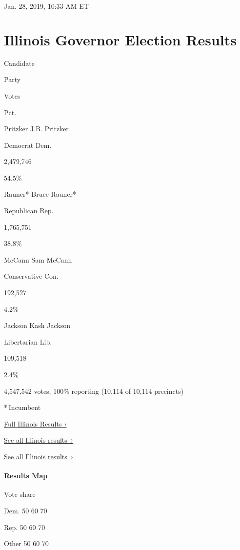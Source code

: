 Jan. 28, 2019, 10:33 AM ET

\hypertarget{illinois-governor-election-results}{%
\section{Illinois Governor Election
Results}\label{illinois-governor-election-results}}

Candidate

Party

Votes

Pct.

 Pritzker J.B. Pritzker

Democrat Dem.

2,479,746

54.5\%

 Rauner* Bruce Rauner*

Republican Rep.

1,765,751

38.8\%

 McCann Sam McCann

Conservative Con.

192,527

4.2\%

 Jackson Kash Jackson

Libertarian Lib.

109,518

2.4\%

4,547,542 votes, 100\% reporting (10,114 of 10,114 precincts)

* Incumbent

\href{https://www.nytimes.com/interactive/2018/11/06/us/elections/results-illinois-elections.html}{Full
Illinois Results ›}

\href{https://www.nytimes.com/interactive/2018/11/06/us/elections/results-illinois-elections.html}{See
all Illinois results~›}

\href{https://www.nytimes.com/interactive/2018/11/06/us/elections/results-illinois-elections.html}{See
all Illinois results~›}

\hypertarget{results-map}{%
\paragraph{Results Map}\label{results-map}}

Vote share

Dem. 50 60 70

Rep. 50 60 70

Other 50 60 70

